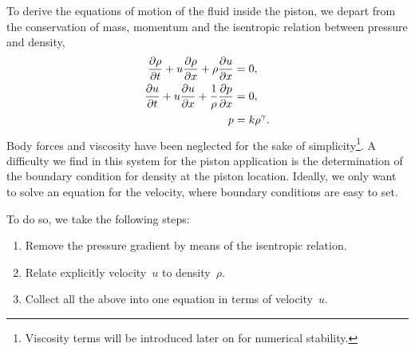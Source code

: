 \documentclass[../../thesis.tex]{subfiles}
\begin{document}
To derive the equations of motion of the fluid inside the piston, 
we depart from the conservation of mass, momentum and the isentropic relation between pressure and density,
\begin{subequations}
\begin{align}
    \pdv{\rho}{t} + u \pdv{\rho}{x} + \rho \pdv{u}{x} &= 0, \\ 
    \pdv{u}{t} + u \pdv{u}{x} + \frac{1}{\rho}\pdv{p}{x} &= 0, \\
    p &= k \rho^{\gamma} \label{eq:isentropic_relation}. 
\end{align}
\end{subequations}
Body forces and viscosity have been neglected for the sake of simplicity\footnote{Viscosity terms will be introduced later on for numerical stability.}.
A difficulty we find in this system for the piston application is the determination of the boundary condition for density at the piston location.
Ideally, we only want to solve an equation for the velocity, where boundary conditions are easy to set.

To do so, we take the following steps:
\begin{enumerate}
    \item Remove the pressure gradient by means of the isentropic relation. 
    \item Relate explicitly velocity~$u$ to density~$\rho$. %
    \item Collect all the above into one equation in terms of velocity~$u$.
\end{enumerate}
\end{document}
